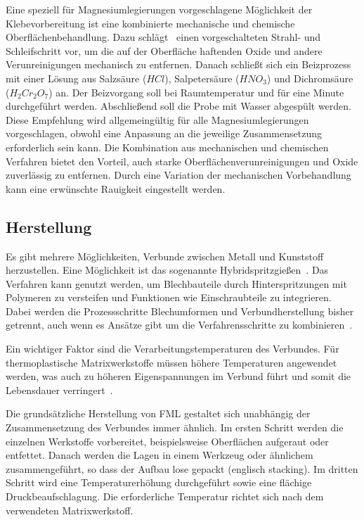 Eine speziell für Magnesiumlegierungen vorgeschlagene Möglichkeit der Klebevorbereitung ist eine kombinierte mechanische und chemische Oberflächenbehandlung.
Dazu schlägt~\cite{Bauer1991} einen vorgeschalteten Strahl- und Schleifschritt vor, um die auf der Oberfläche haftenden Oxide und andere Verunreinigungen mechanisch zu entfernen.
Danach schließt sich ein Beizprozess mit einer Lösung aus Salzsäure ($HCl$), Salpetersäure ($HNO_3$) und Dichromsäure ($H_{2}Cr_{2}O_{7}$) an.
Der Beizvorgang soll bei Raumtemperatur und für eine Minute durchgeführt werden.
Abschließend soll die Probe mit Wasser abgespült werden.
Diese Empfehlung wird allgemeingültig für alle Magnesiumlegierungen vorgeschlagen, obwohl eine Anpassung an die jeweilige Zusammensetzung erforderlich sein kann.
Die Kombination aus mechanischen und chemischen Verfahren bietet den Vorteil, auch starke Oberflächenverunreinigungen und Oxide zuverlässig zu entfernen.
Durch eine Variation der mechanischen Vorbehandlung kann eine erwünschte Rauigkeit eingestellt werden.

\subsection{Herstellung}\label{subsec:herstellung}


Es gibt mehrere Möglichkeiten, Verbunde zwischen Metall und Kunststoff herzustellen.
Eine Möglichkeit ist das sogenannte Hybridspritzgießen~\cite{GeigerManfred2003}.
Das Verfahren kann genutzt werden, um Blechbauteile durch Hinterspritzungen mit Polymeren zu versteifen und Funktionen wie Einschraubteile zu integrieren.
Dabei werden die Prozessschritte Blechumformen und Verbundherstellung bisher getrennt, auch wenn es Ansätze gibt um die Verfahrensschritte zu kombinieren~\cite{Wiedemann2017}.

Ein wichtiger Faktor sind die Verarbeitungstemperaturen des Verbundes.
Für thermoplastische Matrixwerkstoffe müssen höhere Temperaturen angewendet werden, was auch zu höheren Eigenspannungen im Verbund führt und somit die Lebensdauer verringert~\cite{Alderliesten2008}.

Die grundsätzliche Herstellung von FML gestaltet sich unabhängig der Zusammensetzung des Verbundes immer ähnlich.
Im ersten Schritt werden die einzelnen Werkstoffe vorbereitet, beispielsweise Oberflächen aufgeraut oder entfettet.
Danach werden die Lagen in einem Werkzeug oder ähnlichem zusammengeführt, so dass der Aufbau lose gepackt (englisch \glqq stacking\grqq).
Im dritten Schritt wird eine Temperaturerhöhung durchgeführt sowie eine flächige Druckbeaufschlagung.
Die erforderliche Temperatur richtet sich nach dem verwendeten Matrixwerkstoff.

